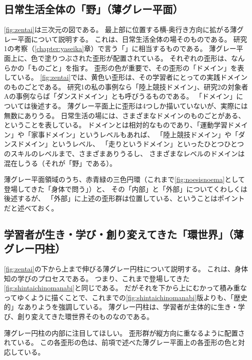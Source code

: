 \subsection{日常生活全体の「野」（薄グレー平面）}
\autoref{fig:zentai}は三次元の図である。
最上部に位置する横-奥行き方向に拡がる薄グレー平面について説明する。
これは、日常生活全体の場そのものである。
研究1の考察（\ref{chapter:yaseika}章）で言う「\textbf{}」に相当するものである。
薄グレー平面上に、色で塗りつぶされた歪形が配置されている。
それぞれの歪形は、なんらかの「ものごと」を指す。
歪形の色が重要で、その歪形の「ドメイン」を表している。
\autoref{fig:zentai}では、黄色い歪形は、その学習者にとっての実践ドメインのものごとである。
研究1の私の事例なら「陸上競技ドメイン」、研究2の対象者Aの事例ならば「ダンスドメイン」とも呼びうるものである。
「ドメイン」については後述する。
薄グレー平面上に歪形は4つしか描いていないが、実際には無数にありうる。
日常生活の場には、さまざまなドメインのものごとがある、ということを表している。
ドメインとは相対的なものであり、「運動学習ドメイン」や「家事ドメイン」というレベルもあれば、
「陸上競技ドメイン」や「ダンスドメイン」というレベル、
「走りというドメイン」といったひとつひとつのスキルのレベルまで、さまざまありうるし、
さまざまなレベルのドメインは混在しうる（それが「野」である）。


薄グレー平面領域のうち、赤青緑の三色円環（これまで\autoref{fig:noesisnoema}として登場してきた「身体で問う」）と、
その「内部」と「外部」についてくわしくは後述するが、
「外部」に上述の歪形群は位置している、ということはポイントだと述べておく。

\subsection{学習者が生き・学び・創り変えてきた「環世界」（薄グレー円柱）}
\autoref{fig:zentai}の下から上まで伸びる薄グレー円柱について説明する。
これは、身体知の学びのプロセスである。
つまり、これまで登場してきた\autoref{fig:shintaichinomanabi}と同じである。
だがそれを下から上にむかって積み重なってゆくように描くことで、これまでの\autoref{fig:shintaichinomanabi}版よりも、「歴史的」なありようを強調している。
薄グレー円柱は、学習者が主体的に生き・学び、創り変えてきた環世界そのものなのである。

薄グレー円柱の内部に注目してほしい。
歪形群が縦方向に重なるように配置されている。
この各歪形の色は、前項で述べた薄グレー平面上の各歪形の色と対応している。

